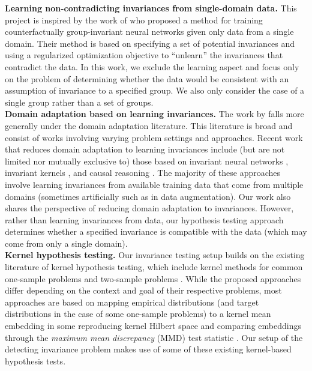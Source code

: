 \textbf{Learning non-contradicting invariances from single-domain data.} This project is inspired by the work of \textcite{Mouli:2021} who proposed a method for training counterfactually group-invariant neural networks given only data from a single domain. Their method is based on specifying a set of potential invariances and using a regularized optimization objective to ``unlearn'' the invariances that contradict the data. In this work, we exclude the learning aspect and focus only on the problem of determining whether the data would be consistent with an assumption of invariance to a specified group. We also only consider the case of a single group rather than a set of groups.
\\

\textbf{Domain adaptation based on learning invariances.} The work by \textcite{Mouli:2021} falls more generally under the domain adaptation literature. This literature is broad and consist of works involving varying problem settings and approaches. Recent work that reduces domain adaptation to learning invariances include (but are not limited nor mutually exclusive to) those based on invariant neural networks \parencite{Li:2018,Gu:2019,Zhao:2019,Schwobel:2021}, invariant kernels \parencite{Li:2018:kernel,Ma:2019,Elesedy:2021:equivariant,Elesedy:2021}, and causal reasoning \parencite{Magliacane:2017,Chen:2020:scm}. The majority of these approaches involve learning invariances from available training data that come from multiple domains (sometimes artificially such as in data augmentation). Our work also shares the perspective of reducing domain adaptation to invariances. However, rather than learning invariances from data, our hypothesis testing approach determines whether a specified invariance is compatible with the data (which may come from only a single domain).
\\

\textbf{Kernel hypothesis testing.} Our invariance testing setup builds on the existing literature of kernel hypothesis testing, which include kernel methods for common one-sample problems \parencite{Zhang:2011,Doran:2014,Kellner:2015,Chwialkowski:2016,Jitkrittum:2020} and two-sample problems \parencite{Gretton:2007,Gretton:2012}. While the proposed approaches differ depending on the context and goal of their respective problems, most approaches are based on mapping empirical  distributions (and target distributions in the case of some one-sample problems) to a kernel mean embedding in some reproducing kernel Hilbert space and comparing embeddings through the \textit{maximum mean discrepancy} (MMD) test statistic \parencite{Harchaoui:2013}.
Our setup of the detecting invariance problem makes use of some of these existing kernel-based hypothesis tests.
\\

